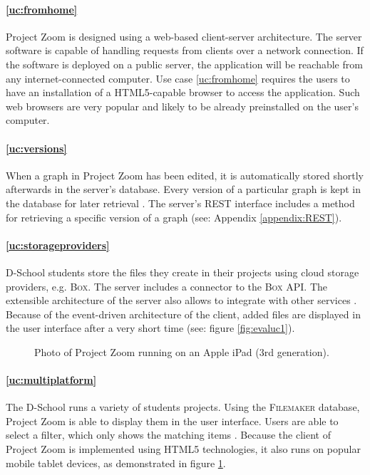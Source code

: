 \paragraph{\ref{uc:fromhome}} Project Zoom is designed using a web-based client-server architecture. The server software is capable of handling requests from clients over a network connection. If the software is deployed on a public server, the application will be reachable from any internet-connected computer. Use case \ref{uc:fromhome} requires the users to have an installation of a HTML5-capable browser to access the application. Such web browsers are very popular and likely to be already preinstalled on the user's computer.

\paragraph{\ref{uc:versions}} When a graph in Project Zoom has been edited, it is automatically stored shortly afterwards in the server's database. Every version of a particular graph is kept in the database for later retrieval \cite{Bocklisch_2013}. The server's REST interface includes a method for retrieving a specific version of a graph (see: Appendix \ref{appendix:REST}).

\paragraph{\ref{uc:storageproviders}} D-School students store the files they create in their projects using cloud storage providers, e.g. \textsc{Box}. The server includes a connector to the \textsc{Box} API. The extensible architecture of the server also allows to integrate with other services \cite{Werkmeister_2013}. Because of the event-driven architecture of the client, added files are displayed in the user interface after a very short time (see: figure \ref{fig:evaluc1}).

\begin{figure}
\begin{center}
\caption{Photo of Project Zoom running on an Apple iPad (3rd generation).}
\label{fig:evaluc6}
\end{center}
\end{figure}

\paragraph{\ref{uc:multiplatform}} The D-School runs a variety of students projects. Using the \textsc{Filemaker} database, Project Zoom is able to display them in the user interface. Users are able to select a filter, which only shows the matching items \cite{Dieckhoff_2013}. Because the client of Project Zoom is implemented using HTML5 technologies, it also runs on popular mobile tablet devices, as demonstrated in figure \ref{fig:evaluc6}.

